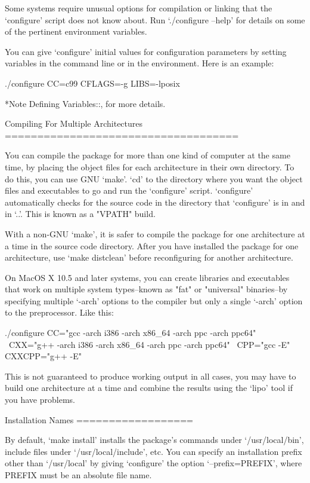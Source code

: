 \begin{DoxyVerbInclude}
   Some systems require unusual options for compilation or linking that
the `configure' script does not know about.  Run `./configure --help'
for details on some of the pertinent environment variables.

   You can give `configure' initial values for configuration parameters
by setting variables in the command line or in the environment.  Here
is an example:

     ./configure CC=c99 CFLAGS=-g LIBS=-lposix

   *Note Defining Variables::, for more details.

Compiling For Multiple Architectures
====================================

   You can compile the package for more than one kind of computer at the
same time, by placing the object files for each architecture in their
own directory.  To do this, you can use GNU `make'.  `cd' to the
directory where you want the object files and executables to go and run
the `configure' script.  `configure' automatically checks for the
source code in the directory that `configure' is in and in `..'.  This
is known as a "VPATH" build.

   With a non-GNU `make', it is safer to compile the package for one
architecture at a time in the source code directory.  After you have
installed the package for one architecture, use `make distclean' before
reconfiguring for another architecture.

   On MacOS X 10.5 and later systems, you can create libraries and
executables that work on multiple system types--known as "fat" or
"universal" binaries--by specifying multiple `-arch' options to the
compiler but only a single `-arch' option to the preprocessor.  Like
this:

     ./configure CC="gcc -arch i386 -arch x86_64 -arch ppc -arch ppc64" \
                 CXX="g++ -arch i386 -arch x86_64 -arch ppc -arch ppc64" \
                 CPP="gcc -E" CXXCPP="g++ -E"

   This is not guaranteed to produce working output in all cases, you
may have to build one architecture at a time and combine the results
using the `lipo' tool if you have problems.

Installation Names
==================

   By default, `make install' installs the package's commands under
`/usr/local/bin', include files under `/usr/local/include', etc.  You
can specify an installation prefix other than `/usr/local' by giving
`configure' the option `--prefix=PREFIX', where PREFIX must be an
absolute file name.


\end{DoxyVerbInclude}
